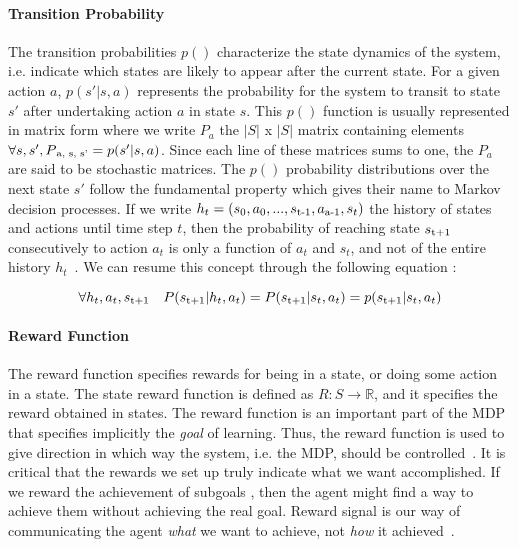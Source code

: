 \paragraph{Transition Probability} The transition probabilities $p()$ characterize the state dynamics of the system, i.e. indicate which states are likely to appear after the current state. For a given action $a$, $p(s'|s,a)$ represents the probability for the system to transit to state $s'$ after undertaking action $a$ in state $s$. This $p()$ function is usually represented in matrix form where we write $P_a$ the $|S|$ x $|S|$ matrix containing elements $\forall s, s', P\textsubscript{a, s, s'} = p(s'|s,a)$. Since each line of these matrices sums to one, the $P_a$ are said to be stochastic matrices. The $p()$ probability distributions over the next state $s'$ follow the fundamental property which gives their name to Markov decision processes. If we write $h_t = (s_0, a_0, ..., s\textsubscript{t-1}, a\textsubscript{a-1}, s_t)$ the history of states and actions until time step $t$, then the probability of reaching state $s\textsubscript{t+1}$ consecutively to action $a_t$ is only a function of $a_t$ and $s_t$, and not of the entire history $h_t$~\cite{Sigaud:2010:MDP:1841781}. We can resume this concept through the following equation :

\begin{equation}
	\forall h_t, a_t, s\textsubscript{t+1} \quad P(s\textsubscript{t+1} | h_t, a_t) = P(s\textsubscript{t+1} | s_t, a_t) = p(s\textsubscript{t+1} | s_t, a_t)
\end{equation}

\paragraph{Reward Function} The reward function specifies rewards for being in a state, or doing some action in a state. The state reward function is defined as $R : S \rightarrow \mathbb{R}$, and it specifies the reward obtained in states. The reward function is an important part of the MDP that specifies implicitly the \textit{goal} of learning. Thus, the reward function is used to give direction in which way the system, i.e. the MDP, should be controlled~\cite{wiering2012reinforcement}. It is critical that the rewards we set up truly indicate what we want accomplished. If we reward the achievement of subgoals , then the agent might find a way to achieve them without achieving the real goal. Reward signal is our way of communicating the agent \textit{what} we want to achieve, not \textit{how} it achieved~\cite{SuttonBarto}.


